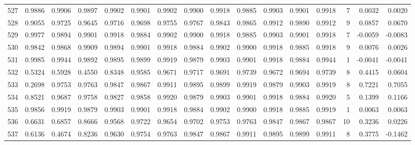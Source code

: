 \begin{tabular}{lrrrrrrrrrrrrrrr}
527 &      0.9886 &  0.9906 &  0.9897 &  0.9902 &  0.9901 &  0.9902 &  0.9900 &  0.9918 &  0.9885 &  0.9903 &   0.9901 &     0.9918 &      7 &                    0.0032 &                     0.0020 \\
528 &      0.9055 &  0.9725 &  0.9645 &  0.9716 &  0.9698 &  0.9755 &  0.9767 &  0.9843 &  0.9865 &  0.9912 &   0.9890 &     0.9912 &      9 &                    0.0857 &                     0.0670 \\
529 &      0.9977 &  0.9894 &  0.9901 &  0.9918 &  0.9884 &  0.9902 &  0.9900 &  0.9918 &  0.9885 &  0.9903 &   0.9901 &     0.9918 &      7 &                   -0.0059 &                    -0.0083 \\
530 &      0.9842 &  0.9868 &  0.9909 &  0.9894 &  0.9901 &  0.9918 &  0.9884 &  0.9902 &  0.9900 &  0.9918 &   0.9885 &     0.9918 &      9 &                    0.0076 &                     0.0026 \\
531 &      0.9985 &  0.9944 &  0.9892 &  0.9895 &  0.9899 &  0.9919 &  0.9879 &  0.9903 &  0.9901 &  0.9918 &   0.9884 &     0.9944 &      1 &                   -0.0041 &                    -0.0041 \\
532 &      0.5324 &  0.5928 &  0.4550 &  0.8348 &  0.9585 &  0.9671 &  0.9717 &  0.9691 &  0.9739 &  0.9672 &   0.9694 &     0.9739 &      8 &                    0.4415 &                     0.0604 \\
533 &      0.2698 &  0.9753 &  0.9763 &  0.9847 &  0.9867 &  0.9911 &  0.9895 &  0.9899 &  0.9919 &  0.9879 &   0.9903 &     0.9919 &      8 &                    0.7221 &                     0.7055 \\
534 &      0.8521 &  0.9687 &  0.9758 &  0.9827 &  0.9858 &  0.9920 &  0.9879 &  0.9903 &  0.9901 &  0.9918 &   0.9884 &     0.9920 &      5 &                    0.1399 &                     0.1166 \\
535 &      0.9856 &  0.9919 &  0.9879 &  0.9903 &  0.9901 &  0.9918 &  0.9884 &  0.9902 &  0.9900 &  0.9918 &   0.9885 &     0.9919 &      1 &                    0.0063 &                     0.0063 \\
536 &      0.6631 &  0.6857 &  0.8666 &  0.9568 &  0.9722 &  0.9654 &  0.9702 &  0.9753 &  0.9763 &  0.9847 &   0.9867 &     0.9867 &     10 &                    0.3236 &                     0.0226 \\
537 &      0.6136 &  0.4674 &  0.8236 &  0.9630 &  0.9754 &  0.9763 &  0.9847 &  0.9867 &  0.9911 &  0.9895 &   0.9899 &     0.9911 &      8 &                    0.3775 &                    -0.1462 \\

\end{tabular}
